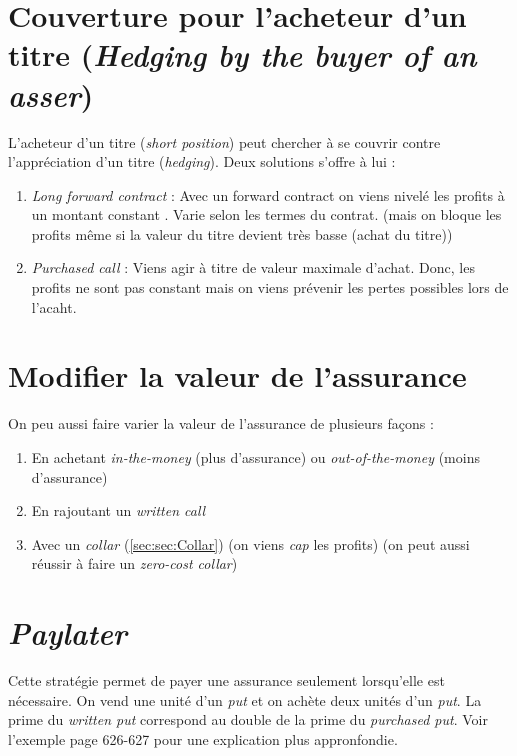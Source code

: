 \documentclass[11pt,french]{report}
\begin{document}
\section{Couverture pour l'acheteur d'un titre (\emph{Hedging by the buyer of an asser})}
\label{sec:hedging buyer}

L'acheteur d'un titre (\emph{short position}) peut chercher à se couvrir contre l'appréciation d'un titre (\emph{hedging}). Deux solutions s'offre à lui :
\begin{enumerate}
\item \emph{Long forward contract} : Avec un forward contract on viens nivelé les profits à un montant constant . Varie selon les termes du contrat. (mais on bloque les profits même si la valeur du titre devient très basse (achat du titre))
\item \emph{Purchased call} : Viens agir à titre de valeur maximale d'achat. Donc, les profits ne sont pas constant mais on viens prévenir les pertes possibles lors de l'acaht.
\end{enumerate}

\section{Modifier la valeur de l'assurance}
On peu aussi faire varier la valeur de l'assurance de plusieurs façons :
\begin{enumerate}
\item En achetant \emph{in-the-money} (plus d'assurance) ou \emph{out-of-the-money} (moins d'assurance)
\item En rajoutant un \emph{written call} 
\item Avec un \emph{collar} (\ref{sec:sec:Collar}) (on viens \emph{cap} les profits) (on peut aussi réussir à faire un \emph{zero-cost collar})
\end{enumerate}

\section{\emph{Paylater}}
\label{sec:paylater}

Cette stratégie permet de payer une assurance seulement lorsqu'elle est nécessaire. On vend une unité d'un \emph{put} et on achète deux unités d'un \emph{put}. La prime du \emph{written put} correspond au double de la prime du \emph{purchased put}. Voir l'exemple page 626-627 pour une explication plus appronfondie.
\end{document}
